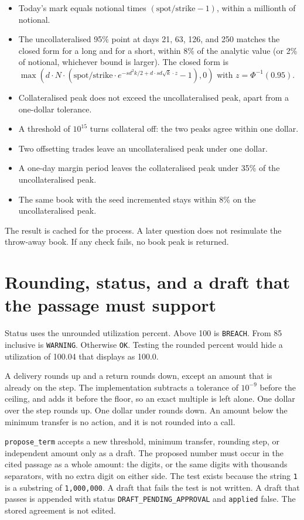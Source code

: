 \documentclass[11pt,a4paper]{article}
\begin{document}
\begin{itemize}
  \item Today's mark equals notional times $(\mathrm{spot}/\mathrm{strike}-1)$, within a millionth of notional.
  \item The uncollateralised 95\% point at days 21, 63, 126, and 250 matches the closed form for a long and for a short, within 8\% of the analytic value (or 2\% of notional, whichever bound is larger). The closed form is $\max(d\cdot N\cdot(\mathrm{spot}/\mathrm{strike}\cdot e^{-sd^{2}k/2+d\cdot sd\sqrt{k}\cdot z}-1),0)$ with $z=\Phi^{-1}(0.95)$.
  \item Collateralised peak does not exceed the uncollateralised peak, apart from a one-dollar tolerance.
  \item A threshold of $10^{15}$ turns collateral off: the two peaks agree within one dollar.
  \item Two offsetting trades leave an uncollateralised peak under one dollar.
  \item A one-day margin period leaves the collateralised peak under 35\% of the uncollateralised peak.
  \item The same book with the seed incremented stays within 8\% on the uncollateralised peak.
\end{itemize}

The result is cached for the process. A later question does not resimulate the throw-away book. If any check fails, no book peak is returned.

\section{Rounding, status, and a draft that the passage must support}

Status uses the unrounded utilization percent. Above 100 is \texttt{BREACH}. From 85 inclusive is \texttt{WARNING}. Otherwise \texttt{OK}. Testing the rounded percent would hide a utilization of 100.04 that displays as 100.0.

A delivery rounds up and a return rounds down, except an amount that is already on the step. The implementation subtracts a tolerance of $10^{-9}$ before the ceiling, and adds it before the floor, so an exact multiple is left alone. One dollar over the step rounds up. One dollar under rounds down. An amount below the minimum transfer is no action, and it is not rounded into a call.

\texttt{propose\_term} accepts a new threshold, minimum transfer, rounding step, or independent amount only as a draft. The proposed number must occur in the cited passage as a whole amount: the digits, or the same digits with thousands separators, with no extra digit on either side. The test exists because the string \texttt{1} is a substring of \texttt{1,000,000}. A draft that fails the test is not written. A draft that passes is appended with status \texttt{DRAFT\_PENDING\_APPROVAL} and \texttt{applied} false. The stored agreement is not edited.
\end{document}
